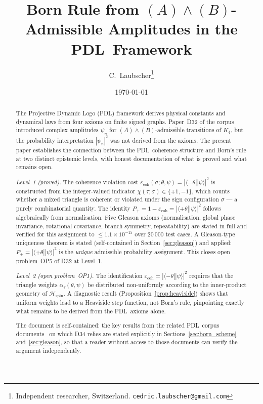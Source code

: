 \documentclass[11pt,a4paper]{article}
\theoremstyle{definition}
\newcommand{\PDL}{\textnormal{PDL}}
\newcommand{\Kfour}{K_4}
\newcommand{\Hspin}{\mathcal{H}_{\mathrm{spin}}}
\newcommand{\ecoh}{\varepsilon_{\mathrm{coh}}}
\newcommand{\pket}[1]{|#1\rangle}
\newcommand{\pbra}[1]{\langle#1|}
\begin{document}
\title{Born Rule from $(A)\wedge(B)$-Admissible Amplitudes in the \PDL\ Framework}
\author{C.~Laubscher\thanks{Independent researcher, Switzerland. \texttt{cedric.laubscher@gmail.com}}}
\date{\small \today}
\maketitle

\begin{abstract}
The Projective Dynamic Logo (\PDL) framework derives physical constants and dynamical laws from four axioms on finite signed graphs. Paper~D32 of the corpus introduced complex amplitudes $\psi_n$ for $(A)\wedge(B)$-admissible transitions of $\Kfour$, but the probability interpretation $|\psi_n|^2$ was not derived from the axioms. The present paper establishes the connection between the \PDL\ coherence structure and Born's rule at two distinct epistemic levels, with honest documentation of what is proved and what remains open.

\emph{Level~1 (proved).} The coherence violation cost $\ecoh(\sigma;\theta,\psi) = |\pbra{-\theta}\pket{\psi}|^2$ is constructed from the integer-valued indicator $\chi(\tau;\sigma) \in \{+1,-1\}$, which counts whether a mixed triangle is coherent or violated under the sign configuration $\sigma$ --- a purely combinatorial quantity. The identity $P_+ = 1 - \ecoh = |\pbra{+\theta}\pket{\psi}|^2$ follows algebraically from normalisation. Five Gleason axioms (normalisation, global phase invariance, rotational covariance, branch symmetry, repeatability) are stated in full and verified for this assignment to $\leq 1.1\times10^{-15}$ over 20\,000 test cases. A Gleason-type uniqueness theorem is stated (self-contained in Section~\ref{sec:gleason}) and applied: $P_+ = |\pbra{+\theta}\pket{\psi}|^2$ is the \emph{unique} admissible probability assignment. This closes open problem~OP5 of D32 at Level~1.

\emph{Level~2 (open problem~OP1).} The identification $\ecoh = |\pbra{-\theta}\pket{\psi}|^2$ requires that the triangle weights $\alpha_\tau(\theta,\psi)$ be distributed non-uniformly according to the inner-product geometry of $\Hspin$. A diagnostic result (Proposition~\ref{prop:heaviside}) shows that uniform weights lead to a Heaviside step function, not Born's rule, pinpointing exactly what remains to be derived from the \PDL\ axioms alone.

The document is self-contained: the key results from the related \PDL\ corpus documents~\cite{Born_PDL_2026,Gleason_PDL_2026} on which D34 relies are stated explicitly in Sections~\ref{sec:born_scheme} and~\ref{sec:gleason}, so that a reader without access to those documents can verify the argument independently.
\end{abstract}
\end{document}
